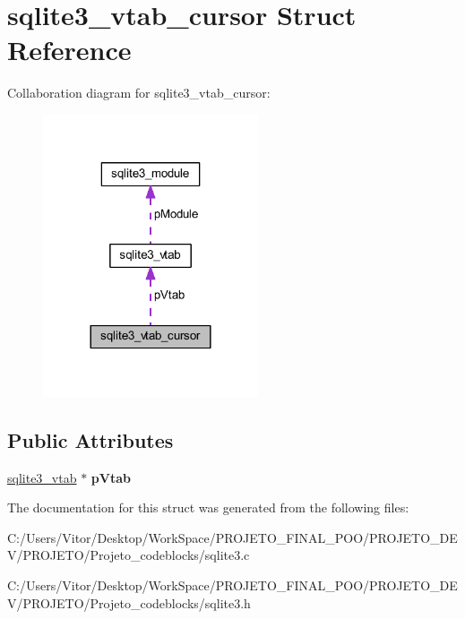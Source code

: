 \hypertarget{structsqlite3__vtab__cursor}{\section{sqlite3\-\_\-vtab\-\_\-cursor Struct Reference}
\label{structsqlite3__vtab__cursor}
}


Collaboration diagram for sqlite3\-\_\-vtab\-\_\-cursor\-:\nopagebreak
\begin{figure}[H]
\begin{center}
\leavevmode
\includegraphics[width=180pt]{structsqlite3__vtab__cursor__coll__graph}
\end{center}
\end{figure}
\subsection*{Public Attributes}
\begin{DoxyCompactItemize}
\item 
\hypertarget{structsqlite3__vtab__cursor_a7bb57f3f9c7c618a9d6d33c6d9820bdc}{\hyperlink{structsqlite3__vtab}{sqlite3\-\_\-vtab} $\ast$ {\bfseries p\-Vtab}}\label{structsqlite3__vtab__cursor_a7bb57f3f9c7c618a9d6d33c6d9820bdc}

\end{DoxyCompactItemize}


The documentation for this struct was generated from the following files\-:\begin{DoxyCompactItemize}
\item 
C\-:/\-Users/\-Vitor/\-Desktop/\-Work\-Space/\-P\-R\-O\-J\-E\-T\-O\-\_\-\-F\-I\-N\-A\-L\-\_\-\-P\-O\-O/\-P\-R\-O\-J\-E\-T\-O\-\_\-\-D\-E\-V/\-P\-R\-O\-J\-E\-T\-O/\-Projeto\-\_\-codeblocks/sqlite3.\-c\item 
C\-:/\-Users/\-Vitor/\-Desktop/\-Work\-Space/\-P\-R\-O\-J\-E\-T\-O\-\_\-\-F\-I\-N\-A\-L\-\_\-\-P\-O\-O/\-P\-R\-O\-J\-E\-T\-O\-\_\-\-D\-E\-V/\-P\-R\-O\-J\-E\-T\-O/\-Projeto\-\_\-codeblocks/sqlite3.\-h\end{DoxyCompactItemize}
